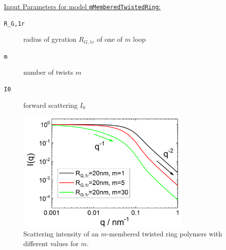 \vspace{5mm}

\noindent
\uline{Input Parameters for model \texttt{mMemberedTwistedRing}:}
\begin{description}
\item[\texttt{R\_G,1r}] radius of gyration $R_{G,1r}$ of one of $m$ loop
\item[\texttt{m}]  number of twists $m$
\item[\texttt{I0}] forward scattering $I_0$
\end{description}

\begin{figure}[htb]
\begin{center}
\includegraphics[width=0.768\textwidth]{../images/form_factor/polymer_rings/mMemberedTwistedRing.png}
\end{center}
\caption{Scattering intensity of an $m$-membered twisted ring polymers with different values for $m$.} \label{fig:mMemberedTwistedRingIQ}
\end{figure}


\clearpage
